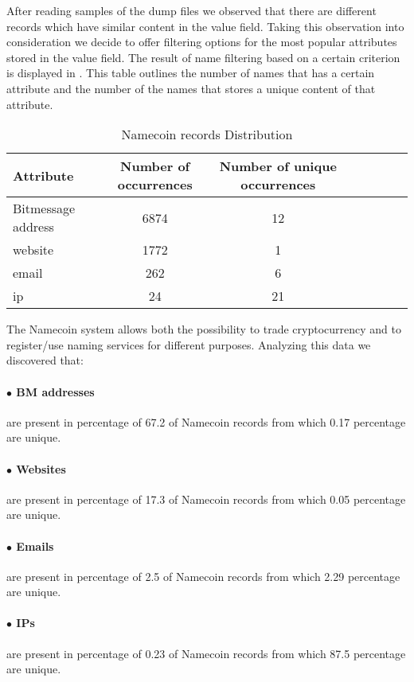 After reading samples of the dump files we observed that there are different records which have similar content in the value field. Taking this observation into consideration we decide to offer filtering options for the most popular attributes stored in the value field. The result of name filtering based on a certain criterion is displayed in . This table outlines the number of names that has a certain attribute and the number of the names that stores a unique content of that attribute.

\begin{center}
	\begin{table}[htb]
		\centering
		\caption{Namecoin records Distribution}
		\begin{tabular}{l*{6}{c}r}
			Attribute & Number of occurrences & Number of unique occurrences\\
			\hline
			Bitmessage address & 6874 & 12\\
			website & 1772 & 1\\
			email & 262 & 6\\
			ip & 24 & 21
		\end{tabular}
		\label{table:count-unique-table}
	\end{table}
\end{center}

The Namecoin system allows both the possibility to trade  cryptocurrency and to register/use naming services for different purposes.
Analyzing this data we discovered that:
\paragraph{$\bullet$ BM addresses} are present in percentage of 67.2 of Namecoin records from which 0.17 percentage are unique.
\paragraph{$\bullet$ Websites} are present in percentage of 17.3 of Namecoin records from which 0.05 percentage are unique.
\paragraph{$\bullet$ Emails} are present in percentage of 2.5 of Namecoin records from which 2.29 percentage are unique.
\paragraph{$\bullet$ IPs} are present in percentage of 0.23 of Namecoin records from which 87.5 percentage are unique.

